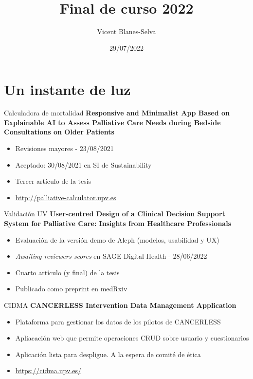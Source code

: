 \documentclass[bigger]{beamer}
\title{Final de curso 2022}
\author[BDSLab]{Vicent Blanes-Selva}
\date{29/07/2022}
\begin{document}
	\begin{frame}
		\titlepage
	\end{frame}

	\section{Un instante de luz}	
	\begin{frame}{Calculadora de mortalidad}
		\textbf{Responsive and Minimalist App Based on Explainable AI to Assess Palliative Care Needs during Bedside Consultations on Older Patients}
		\begin{itemize}
			\item Revisiones mayores - 23/08/2021
			\item Aceptado: 30/08/2021 en SI de Sustainability
			\item Tercer artículo de la tesis
			\item \url{http://palliative-calculator.upv.es}
		\end{itemize}
	\end{frame}


	\begin{frame}{Validación UV}
		\textbf{User-centred Design of a Clinical Decision Support System for Palliative Care: Insights from Healthcare Professionals}
		\begin{itemize}
			\item Evaluación de la versión demo de Aleph (modelos, usabilidad y UX)
			\item \textit{Awaiting reviewers scores} en SAGE Digital Health - 28/06/2022
			\item Cuarto artículo (y final) de la tesis
			\item Publicado como preprint en medRxiv

		\end{itemize}	
	\end{frame}

	\begin{frame}{CIDMA}
		\textbf{CANCERLESS Intervention Data Management Application}
		\begin{itemize}
			\item Plataforma para gestionar los datos de los pilotos de CANCERLESS
			\item Apliacación web que permite operaciones CRUD sobre usuario y cuestionarios
			\item Aplicación lista para despligue. A la espera de comité de ética
			\item \url{https://cidma.upv.es/}
		\end{itemize}
	\end{frame}
\end{document}
